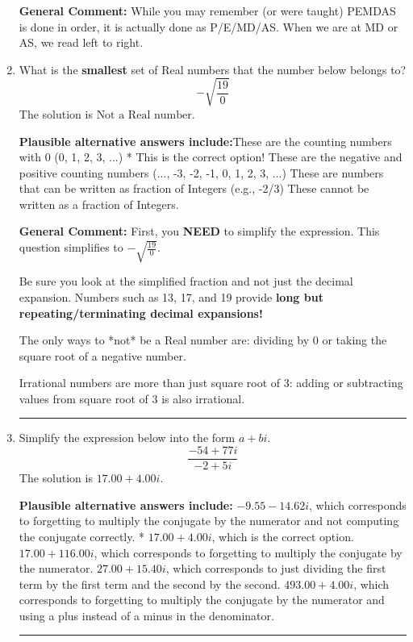 \documentclass{extbook}[14pt]
\newcommand{\litem}[1]{\item #1

\rule{\textwidth}{0.4pt}}
\begin{document}
\begin{enumerate}
{\textbf{General Comment:} While you may remember (or were taught) PEMDAS is done in order, it is actually done as P/E/MD/AS. When we are at MD or AS, we read left to right.
}
\litem{
What is the \textbf{smallest} set of Real numbers that the number below belongs to?
\[ -\sqrt{\frac{19}{0}} \]The solution is \( \text{Not a Real number} \).\begin{enumerate}[label=\Alph*.]
\textbf{Plausible alternative answers include:}These are the counting numbers with 0 (0, 1, 2, 3, ...)
* This is the correct option!
These are the negative and positive counting numbers (..., -3, -2, -1, 0, 1, 2, 3, ...)
These are numbers that can be written as fraction of Integers (e.g., -2/3)
These cannot be written as a fraction of Integers.
\end{enumerate}

\textbf{General Comment:} First, you \textbf{NEED} to simplify the expression. This question simplifies to $-\sqrt{\frac{19}{0}}$. 
 
 Be sure you look at the simplified fraction and not just the decimal expansion. Numbers such as 13, 17, and 19 provide \textbf{long but repeating/terminating decimal expansions!} 
 
 The only ways to *not* be a Real number are: dividing by 0 or taking the square root of a negative number. 
 
 Irrational numbers are more than just square root of 3: adding or subtracting values from square root of 3 is also irrational.
}
\litem{
Simplify the expression below into the form $a+bi$.
\[ \frac{-54 + 77 i}{-2 + 5 i} \]The solution is \( 17.00  + 4.00 i \).\begin{enumerate}[label=\Alph*.]
\textbf{Plausible alternative answers include:} $-9.55  - 14.62 i$, which corresponds to forgetting to multiply the conjugate by the numerator and not computing the conjugate correctly.
* $17.00  + 4.00 i$, which is the correct option.
 $17.00  + 116.00 i$, which corresponds to forgetting to multiply the conjugate by the numerator.
 $27.00  + 15.40 i$, which corresponds to just dividing the first term by the first term and the second by the second.
 $493.00  + 4.00 i$, which corresponds to forgetting to multiply the conjugate by the numerator and using a plus instead of a minus in the denominator.
\end{enumerate}

}
\end{enumerate}
\end{document}
